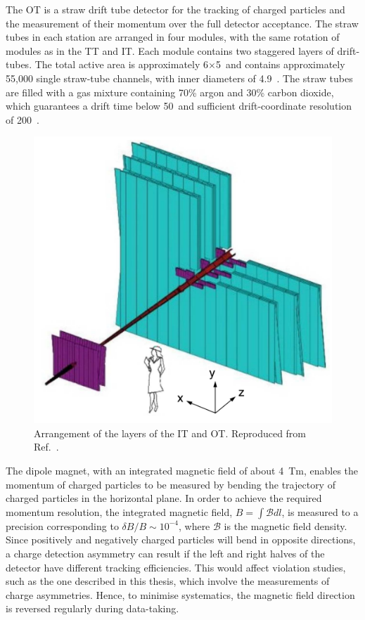 The OT is a straw drift tube detector for the tracking of charged particles and the measurement of their momentum over the full detector acceptance. The straw tubes in each station are arranged in four modules, with the same rotation of modules as in the TT and IT. Each module contains two staggered layers of drift-tubes. The total active area is approximately 6$\times$5~\mma and contains approximately 55,000 single straw-tube channels, with inner diameters of 4.9~\mm. The straw tubes are filled with a gas mixture containing 70\% argon and 30\% carbon dioxide, which guarantees a drift time below 50~\ns and sufficient drift-coordinate resolution of 200~\mum.

\begin{figure}
\centering
\includegraphics[width=0.5\linewidth]{figures/detector/InnerAndOuterTracker.pdf}
\caption{Arrangement of the layers of the IT and OT. Reproduced from Ref.~\cite{lhcbdetector2008}.}
\label{itandot}
\end{figure}

The dipole magnet, with an integrated magnetic field of about 4~Tm, enables the momentum of charged particles to be measured by bending the trajectory of charged particles in the horizontal plane. In order to achieve the required momentum resolution, the integrated magnetic field, $B = \int{\mathcal{B} dl}$, is measured to a precision corresponding to $\delta B /B \sim 10^{-4}$, where $\mathcal{B}$ is the magnetic field density. Since positively and negatively charged particles will bend in opposite directions, a charge detection asymmetry can result if the left and right halves of the detector have different tracking efficiencies. This would affect \CP violation studies, such as the one described in this thesis, which involve the measurements of charge asymmetries. Hence, to minimise systematics, the magnetic field direction is reversed regularly during data-taking.

